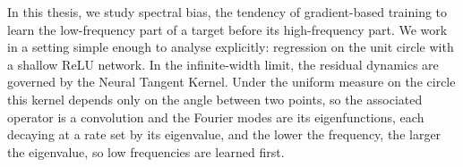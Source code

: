 %
%
%

In this thesis, we study spectral bias, the tendency of gradient-based training to
learn the low-frequency part of a target before its high-frequency part. We work
in a setting simple enough to analyse explicitly: regression on the unit circle
with a shallow ReLU network. In the infinite-width limit, the residual dynamics
are governed by the Neural Tangent Kernel. Under the uniform measure on the
circle this kernel depends only on the angle between two points, so the
associated operator is a convolution and the Fourier modes are its
eigenfunctions, each decaying at a rate set by its eigenvalue, and the lower the
frequency, the larger the eigenvalue, so low frequencies are learned first.

